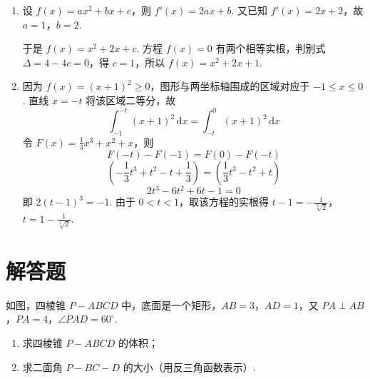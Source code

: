 \begin{solution}
\begin{enumerate}
\item 设 \(f(x)=ax^2+bx+c\)，则 \(f'(x)=2ax+b\). 又已知 \(f'(x)=2x+2\)，故 \(a=1\)，\(b=2\).

于是 \(f(x)=x^2+2x+c\). 方程 \(f(x)=0\) 有两个相等实根，判别式 \(\Delta=4-4c=0\)，得 \(c=1\)，所以 \(f(x)=x^2+2x+1\).

\item 因为 \(f(x)=(x+1)^2\geqslant0\)，图形与两坐标轴围成的区域对应于 \(-1\leqslant x\leqslant0\). 直线 \(x=-t\) 将该区域二等分，故
\[
\int_{-1}^{-t}(x+1)^2\,\mathrm{d}x=\int_{-t}^{0}(x+1)^2\,\mathrm{d}x
\]
令 \(F(x)=\frac13x^3+x^2+x\)，则
\[
F(-t)-F(-1)=F(0)-F(-t)
\]
\[
\left(-\frac13t^3+t^2-t+\frac13\right)=\left(\frac13t^3-t^2+t\right)
\]
\[
2t^3-6t^2+6t-1=0
\]
即 \(2(t-1)^3=-1\). 由于 \(0<t<1\)，取该方程的实根得
\(t-1=-\frac1{\sqrt[3]{2}}\)，\(t=1-\frac1{\sqrt[3]{2}}\).
\end{enumerate}
\end{solution}

\section{解答题}

\begin{problem}
如图，四棱锥 \(P-ABCD\) 中，底面是一个矩形，\(AB=3\)，\(AD=1\)，又 \(PA\perp AB\)，\(PA=4\)，\(\angle PAD=60^\circ\).

\begin{enumerate}
\item 求四棱锥 \(P-ABCD\) 的体积；
\item 求二面角 \(P-BC-D\) 的大小（用反三角函数表示）.
\end{enumerate}

\end{problem}

